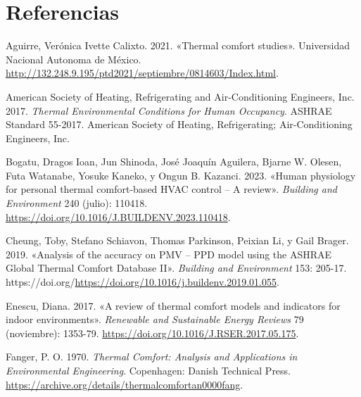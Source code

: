 \documentclass[
  letterpaper,
  DIV=11,
  numbers=noendperiod]{scrreport}
\newlength{\cslhangindent}
\newlength{\cslentryspacingunit} %
\newenvironment{CSLReferences}[2] %
 {%
  \setlength{\parindent}{0pt}
  \ifodd #1
  \let\oldpar\par
  \def\par{\hangindent=\cslhangindent\oldpar}
  \fi
  \setlength{\parskip}{#2\cslentryspacingunit}
 }%
 {}
\begin{document}

\hypertarget{referencias}{%
\chapter*{Referencias}\label{referencias}}


\hypertarget{refs}{}
\begin{CSLReferences}{1}{0}
\leavevmode{}%
Aguirre, Verónica Ivette Calixto. 2021. {«Thermal comfort studies»}.
Universidad Nacional Autonoma de México.
\url{http://132.248.9.195/ptd2021/septiembre/0814603/Index.html}.

\leavevmode{}%
American Society of Heating, Refrigerating and Air-Conditioning
Engineers, Inc. 2017. \emph{Thermal Environmental Conditions for Human
Occupancy}. ASHRAE Standard 55-2017. American Society of Heating,
Refrigerating; Air-Conditioning Engineers, Inc.

\leavevmode{}%
Bogatu, Dragos Ioan, Jun Shinoda, José Joaquín Aguilera, Bjarne W.
Olesen, Futa Watanabe, Yosuke Kaneko, y Ongun B. Kazanci. 2023. {«Human
physiology for personal thermal comfort-based HVAC control -- A
review»}. \emph{Building and Environment} 240 (julio): 110418.
\url{https://doi.org/10.1016/J.BUILDENV.2023.110418}.

\leavevmode{}%
Cheung, Toby, Stefano Schiavon, Thomas Parkinson, Peixian Li, y Gail
Brager. 2019. {«Analysis of the accuracy on PMV -- PPD model using the
ASHRAE Global Thermal Comfort Database II»}. \emph{Building and
Environment} 153: 205-17.
https://doi.org/\url{https://doi.org/10.1016/j.buildenv.2019.01.055}.

\leavevmode{}%
Enescu, Diana. 2017. {«A review of thermal comfort models and indicators
for indoor environments»}. \emph{Renewable and Sustainable Energy
Reviews} 79 (noviembre): 1353-79.
\url{https://doi.org/10.1016/J.RSER.2017.05.175}.

\leavevmode{}%
Fanger, P. O. 1970. \emph{Thermal Comfort: Analysis and Applications in
Environmental Engineering}. Copenhagen: Danish Technical Press.
\url{https://archive.org/details/thermalcomfortan0000fang}.


\end{CSLReferences}
\end{document}
